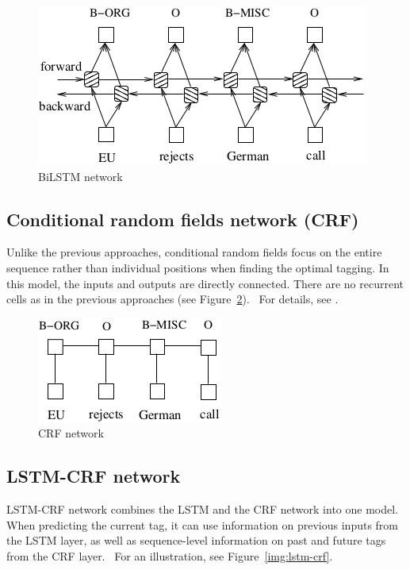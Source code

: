 \begin{figure}[htbp]
    \centering
    \includegraphics{text/images/bilstm.png}
    \caption{BiLSTM network~\cite{BiLSTMCRF}}\label{img:bilstm}
\end{figure}

\subsection{Conditional random fields network (CRF)}
Unlike the previous approaches, conditional random fields focus on the entire sequence rather than individual positions when finding the optimal tagging. In this model, the inputs and outputs are directly connected. There are no recurrent cells as in the previous approaches (see Figure~\ref{img:crf}).~\cite{BiLSTMCRF} For details, see \cite{CRF}.

\begin{figure}[htbp]
    \centering
    \includegraphics{text/images/crf.png}
    \caption{CRF network~\cite{BiLSTMCRF}}\label{img:crf}
\end{figure}

\subsection{LSTM-CRF network}
LSTM-CRF network combines the LSTM and the CRF network into one model.
When predicting the current tag, it can use information on previous inputs from the LSTM layer, as well as sequence-level information on past and future tags from the CRF layer.~\cite{BiLSTMCRF} For an illustration, see Figure~\ref{img:lstm-crf}.

